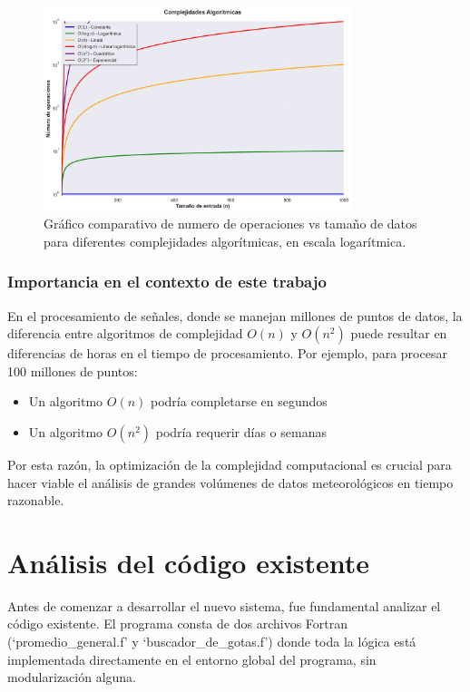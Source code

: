 \documentclass[12pt,a4paper]{article}
\begin{document}
\begin{figure}[H]
    \centering
    \includegraphics[width=0.8\textwidth]{figures/complejidades_algoritmicas.png}
    \caption{Gráfico comparativo de numero de operaciones vs tamaño de datos para diferentes complejidades algorítmicas, en escala logarítmica. }
    \label{fig:complejidades_algoritmicas}
\end{figure}

\subsubsection{Importancia en el contexto de este trabajo}

En el procesamiento de señales, donde se manejan millones de puntos de datos, la diferencia entre algoritmos de complejidad $O(n)$ y $O(n^2)$ puede resultar en diferencias de horas en el tiempo de procesamiento. Por ejemplo, para procesar 100 millones de puntos:

\begin{itemize}
    \item Un algoritmo $O(n)$ podría completarse en segundos
    \item Un algoritmo $O(n^2)$ podría requerir días o semanas
\end{itemize}

Por esta razón, la optimización de la complejidad computacional es crucial para hacer viable el análisis de grandes volúmenes de datos meteorológicos en tiempo razonable.

\section{Análisis del código existente}
\lhead{}

Antes de comenzar a desarrollar el nuevo sistema, fue fundamental analizar el código existente. El programa consta de dos archivos Fortran (`promedio\_general.f' y `buscador\_de\_gotas.f') donde toda la lógica está implementada directamente en el entorno global del programa, sin modularización alguna. 
\end{document}
